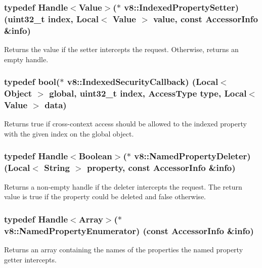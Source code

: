 \subsubsection[{Indexed\+Property\+Setter}]{\setlength{\rightskip}{0pt plus 5cm}typedef {\bf Handle}$<${\bf Value}$>$($\ast$ v8\+::\+Indexed\+Property\+Setter) (uint32\+\_\+t index, {\bf Local}$<$ {\bf Value} $>$ value, const {\bf Accessor\+Info} \&info)}\label{namespacev8_a3ca53e294b9b695b3777af904ca942b6}
Returns the value if the setter intercepts the request. Otherwise, returns an empty handle. \hypertarget{namespacev8_af8be2a3d30e9f3af21a6e633aba8a2ba}{}
\subsubsection[{Indexed\+Security\+Callback}]{\setlength{\rightskip}{0pt plus 5cm}typedef bool($\ast$ v8\+::\+Indexed\+Security\+Callback) ({\bf Local}$<$ {\bf Object} $>$ global, uint32\+\_\+t index, {\bf Access\+Type} type, {\bf Local}$<$ {\bf Value} $>$ data)}\label{namespacev8_af8be2a3d30e9f3af21a6e633aba8a2ba}
Returns true if cross-\/context access should be allowed to the indexed property with the given index on the global object. \hypertarget{namespacev8_a7899471fae82b252750b81f41d5c1e26}{}
\subsubsection[{Named\+Property\+Deleter}]{\setlength{\rightskip}{0pt plus 5cm}typedef {\bf Handle}$<${\bf Boolean}$>$($\ast$ v8\+::\+Named\+Property\+Deleter) ({\bf Local}$<$ {\bf String} $>$ property, const {\bf Accessor\+Info} \&info)}\label{namespacev8_a7899471fae82b252750b81f41d5c1e26}
Returns a non-\/empty handle if the deleter intercepts the request. The return value is true if the property could be deleted and false otherwise. \hypertarget{namespacev8_acbd04b83708cb5a80e73e0396f176e58}{}
\subsubsection[{Named\+Property\+Enumerator}]{\setlength{\rightskip}{0pt plus 5cm}typedef {\bf Handle}$<${\bf Array}$>$($\ast$ v8\+::\+Named\+Property\+Enumerator) (const {\bf Accessor\+Info} \&info)}\label{namespacev8_acbd04b83708cb5a80e73e0396f176e58}
Returns an array containing the names of the properties the named property getter intercepts. \hypertarget{namespacev8_ab9effde41da1c073eddbd4a11a62bd0b}{}
